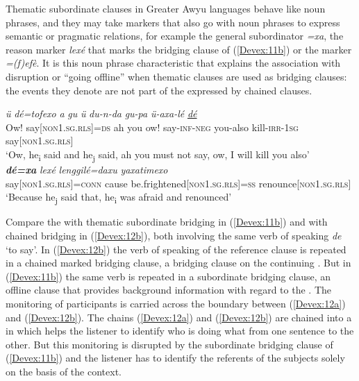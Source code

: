 \documentclass[output=paper]{LSP/langsci}
\begin{document}
Thematic subordinate clauses in Greater Awyu languages behave like noun phrases, and they may take markers that also go with noun phrases to  express semantic or pragmatic relations, for example the general subordinator \textit{=xa}, the  reason marker \textit{lexé} that marks the bridging clause of (\ref{Devex:11b}) or the  marker \textit{=(f)efè}. It is this noun phrase characteristic that explains the association with disruption or ``going offline'' when thematic clauses are used as bridging clauses: the events they denote are not part of the  expressed by chained clauses.

\begin{exe}
\ex \label{Devex:11ab}
\begin{xlist}
\ex \label{Devex:11a}		
\gll \textit{ü} \textit{dé=tofexo} \textit{a} \textit{gu} \textit{ü}	\textit{du-n-da} \textit{gu-pa} \textit{ü-axa-lé} \underline{\textit{dé}}\\
Ow!	say\textsc{[non1.sg.rls]=ds} ah you ow! say-\textsc{inf-neg} you-also kill-\textsc{irr-1sg} say\textsc{[non1.sg.rls]}\\
\glt `Ow, he\textsubscript{i} said and he\textsubscript{j} said, ah you must not say, ow, I will kill you also'\\

\ex \label{Devex:11b}		
\gll \textbf{\textit{dé=xa}} \textit{lexé} \textit{lenggilé=daxu} \textit{yaxatimexo}\\
say\textsc{[non1.sg.rls}]=\textsc{conn} cause be.frightened[\textsc{non1.sg.rls}]=\textsc{ss} renounce[\textsc{non1.sg.rls}]\\
\glt `Because he\textsubscript{j} said that, he\textsubscript{i} was afraid and renounced'\\
\end{xlist}
\end{exe}

Compare the  with thematic subordinate bridging in (\ref{Devex:11b}) and with chained bridging in (\ref{Devex:12b}), both involving the same verb of speaking \textit{de} `to say'. In (\ref{Devex:12b}) the verb of speaking of the reference clause is repeated in a chained  marked bridging clause, a bridging clause on the continuing . But in (\ref{Devex:11b}) the same verb is repeated in a subordinate bridging clause, an offline clause that provides background information with regard to the . The  monitoring of participants is carried across the boundary between (\ref{Devex:12a}) and (\ref{Devex:12b}). The chains (\ref{Devex:12a}) and (\ref{Devex:12b}) are chained into a  in which  helps the listener to identify who is doing what from one sentence to the other. But this  monitoring is disrupted by the subordinate bridging clause of (\ref{Devex:11b}) and the listener has to identify the referents of the subjects solely on the basis of the context. 
\end{document}

